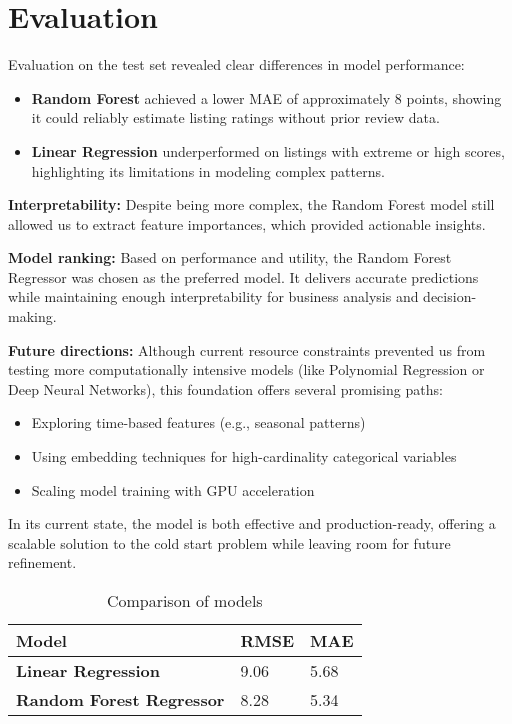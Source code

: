 \section{Evaluation }
\label{chap:evaluation}
Evaluation on the test set revealed clear differences in model performance:

\begin{itemize}
    \item \textbf{Random Forest} achieved a lower MAE of approximately 8 points, showing it could reliably estimate listing ratings without prior review data.
    \item \textbf{Linear Regression} underperformed on listings with extreme or high scores, highlighting its limitations in modeling complex patterns.
\end{itemize}

\textbf{Interpretability:}  
Despite being more complex, the Random Forest model still allowed us to extract feature importances, which provided actionable insights.

\textbf{Model ranking:}  
Based on performance and utility, the Random Forest Regressor was chosen as the preferred model. It delivers accurate predictions while maintaining enough interpretability for business analysis and decision-making.

\textbf{Future directions:}  
Although current resource constraints prevented us from testing more computationally intensive models (like Polynomial Regression or Deep Neural Networks), this foundation offers several promising paths:
\begin{itemize}
    \item Exploring time-based features (e.g., seasonal patterns)
    \item Using embedding techniques for high-cardinality categorical variables
    \item Scaling model training with GPU acceleration
\end{itemize}

In its current state, the model is both effective and production-ready, offering a scalable solution to the cold start problem while leaving room for future refinement.

\begin{table}[ht!]
\small
\centering
\caption{Comparison of models}
\label{tab:model_comparison}
\begin{tabular}{lll} 
\toprule
Model & {RMSE} & {MAE} \\
\midrule
\textbf{Linear Regression} & 9.06 & 5.68 \\
\textbf{Random Forest Regressor} &  8.28 & 5.34 \\
\bottomrule
\end{tabular}
\end{table}